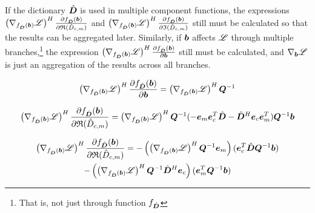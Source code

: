 \begin{appendices}
\sloppy If the dictionary $\hat{\bm{D}}$ is used in multiple component functions, the expressions $\left(\nabla_{f_{\hat{\bm{D}}}(\bm{b})} \mathscr{L}\right)^H\frac{\partial f_{\hat{\bm{D}}}(\bm{b})}{\partial \mathfrak{R}(\hat{D}_{c,m})}$ and $\left(\nabla_{f_{\hat{\bm{D}}}(\bm{b})} \mathscr{L}\right)^H\frac{\partial f_{\hat{\bm{D}}}(\bm{b})}{\partial \mathfrak{I}(\hat{D}_{c,m})}$ still must be calculated so that the results can be aggregated later. Similarly, if $\bm{b}$ affects $\mathscr{L}$ through multiple branches,\footnote{That is, not just through function $f_{\hat{\bm{D}}}$} the expression $\left(\nabla_{f_{\hat{\bm{D}}}(\bm{b})} \mathscr{L}\right)^H\frac{\partial f_{\hat{\bm{D}}}(\bm{b})}{\partial \bm{b}}$ still must be calculated, and $\nabla_{\bm{b}} \mathscr{L}$ is just an aggregation of the results across all branches.

\begin{equation}
\left(\nabla_{f_{\hat{\bm{D}}}(\bm{b})} \mathscr{L}\right)^H\frac{\partial f_{\hat{\bm{D}}}(\bm{b})}{\partial \bm{b}} =\left(\nabla_{f_{\hat{\bm{D}}}(\bm{b})} \mathscr{L}\right)^H\bm{Q}^{-1}
\end{equation}

\begin{equation}
\left(\nabla_{f_{\hat{\bm{D}}}(\bm{b})} \mathscr{L}\right)^H\frac{\partial f_{\hat{\bm{D}}}(\bm{b})}{\partial \mathfrak{R}(\hat{D}_{c,m})} = \left(\nabla_{f_{\hat{\bm{D}}}(\bm{b})} \mathscr{L}\right)^H\bm{Q}^{-1}(-\bm{e}_m\bm{e}_c^T\hat{\bm{D}} - \hat{\bm{D}}^H\bm{e}_c\bm{e}_m^T)\bm{Q}^{-1}\bm{b}
\end{equation}

\begin{multline}
\left(\nabla_{f_{\hat{\bm{D}}}(\bm{b})} \mathscr{L}\right)^H\frac{\partial f_{\hat{\bm{D}}}(\bm{b})}{\partial \mathfrak{R}(\hat{D}_{c,m})} = -\left(\left(\nabla_{f_{\hat{\bm{D}}}(\bm{b})} \mathscr{L}\right)^H\bm{Q}^{-1}\bm{e}_m\right)(\bm{e}_c^T\hat{\bm{D}}\bm{Q}^{-1}\bm{b}) \\- \left(\left(\nabla_{f_{\hat{\bm{D}}}(\bm{b})} \mathscr{L}\right)^H\bm{Q}^{-1}\hat{\bm{D}}^H\bm{e}_c\right)(\bm{e}_m^T\bm{Q}^{-1}\bm{b})
\end{multline}


\end{appendices}

